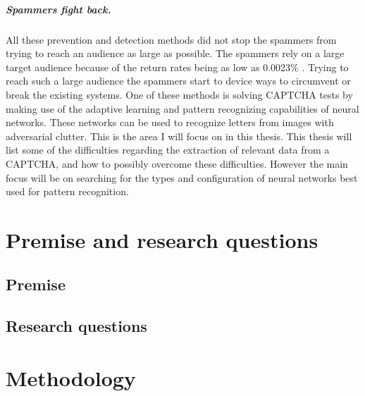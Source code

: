 \documentclass[pdftex,a4paper,12pt,twoside]{report}
\begin{document}
\paragraph{Spammers fight back.}
All these prevention and detection methods did not stop the spammers from trying to reach an audience as large  as possible. The spammers rely on a large target audience because of the return rates being as low as 0.0023\% \citep{Cobb2003}. Trying to reach such a large audience the spammers start to device ways to circumvent or break the existing systems. One of these methods is solving CAPTCHA tests by making use of the adaptive learning and pattern recognizing capabilities of neural networks. These networks can be used to recognize letters from images with adversarial clutter.
This is the area I will focus on in this thesis. This thesis will list some of the difficulties regarding the extraction of relevant data from a CAPTCHA, and how to possibly overcome these difficulties. However the main focus will be on searching for the types and configuration of neural networks best used for pattern recognition.
\chapter{Premise and research questions}
\label{ch:Premise}

\section{Premise}
\label{sec:Premise}


\section{Research questions}
\label{sec:researquestions}





\chapter{Methodology}
\label{ch:methodology}
\end{document}
